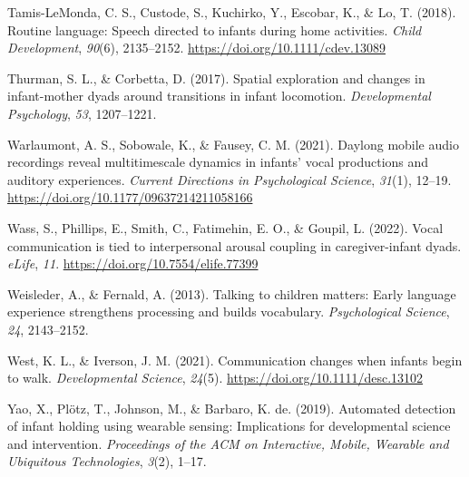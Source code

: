 \documentclass[
  man]{apa6}
\newlength{\cslhangindent}
\newlength{\cslentryspacingunit} %
\newenvironment{CSLReferences}[2] %
 {%
  \setlength{\parindent}{0pt}
  \ifodd #1
  \let\oldpar\par
  \def\par{\hangindent=\cslhangindent\oldpar}
  \fi
  \setlength{\parskip}{#2\cslentryspacingunit}
 }%
 {}
\begin{document}
\begin{CSLReferences}{1}{0}
\leavevmode{}%
Tamis-LeMonda, C. S., Custode, S., Kuchirko, Y., Escobar, K., \& Lo, T. (2018). Routine language: Speech directed to infants during home activities. \emph{Child Development}, \emph{90}(6), 2135--2152. \url{https://doi.org/10.1111/cdev.13089}

\leavevmode{}%
Thurman, S. L., \& Corbetta, D. (2017). Spatial exploration and changes in infant-mother dyads around transitions in infant locomotion. \emph{Developmental Psychology}, \emph{53}, 1207--1221.

\leavevmode{}%
Warlaumont, A. S., Sobowale, K., \& Fausey, C. M. (2021). Daylong mobile audio recordings reveal multitimescale dynamics in infants' vocal productions and auditory experiences. \emph{Current Directions in Psychological Science}, \emph{31}(1), 12--19. \url{https://doi.org/10.1177/09637214211058166}

\leavevmode{}%
Wass, S., Phillips, E., Smith, C., Fatimehin, E. O., \& Goupil, L. (2022). Vocal communication is tied to interpersonal arousal coupling in caregiver-infant dyads. \emph{{eLife}}, \emph{11}. \url{https://doi.org/10.7554/elife.77399}

\leavevmode{}%
Weisleder, A., \& Fernald, A. (2013). Talking to children matters: Early language experience strengthens processing and builds vocabulary. \emph{Psychological Science}, \emph{24}, 2143--2152.

\leavevmode{}%
West, K. L., \& Iverson, J. M. (2021). Communication changes when infants begin to walk. \emph{Developmental Science}, \emph{24}(5). \url{https://doi.org/10.1111/desc.13102}

\leavevmode{}%
Yao, X., Plötz, T., Johnson, M., \& Barbaro, K. de. (2019). Automated detection of infant holding using wearable sensing: Implications for developmental science and intervention. \emph{Proceedings of the ACM on Interactive, Mobile, Wearable and Ubiquitous Technologies}, \emph{3}(2), 1--17.

\end{CSLReferences}
\end{document}
